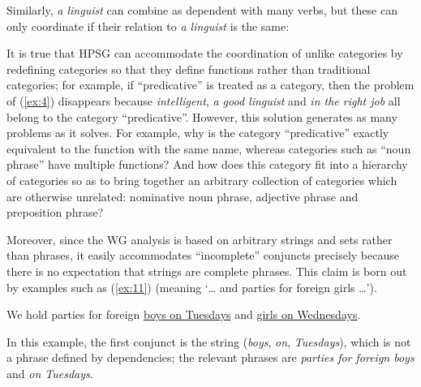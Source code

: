 \documentclass[output=paper]{langscibook}
\begin{document}
\begin{exe}
	\label{ex:5}

	\label{ex:6}

	\label{ex:7}
\end{exe}

Similarly, \emph{a linguist} can combine as dependent with many verbs, but these can only coordinate if their relation to \emph{a linguist} is the same:

\begin{exe}
	\label{ex:8}

	\label{ex:9}

	\label{ex:10}
\end{exe}

It is true that HPSG can accommodate the coordination of unlike categories by redefining categories so that they define functions rather than traditional categories; for example, if ``predicative'' is treated as a category, then the problem of (\ref{ex:4}) disappears because \emph{intelligent}, \emph{a good linguist} and \emph{in the right job} all belong to the category ``predicative''. However, this solution generates as many problems as it solves. For example, why is the category ``predicative'' exactly equivalent to the function with the same name, whereas categories such as ``noun phrase'' have multiple functions? And how does this category fit into a hierarchy of categories so as to bring together an arbitrary collection of categories which are otherwise unrelated: nominative noun phrase, adjective phrase and preposition phrase?

Moreover, since the WG analysis is based on arbitrary strings and sets rather than phrases, it easily accommodates ``incomplete'' conjuncts \citep[405]{Hudson90a-u} \citep{Hudson1982} precisely because there is no expectation that strings are complete phrases. This claim is born out by examples such as (\ref{ex:11}) (meaning ‘… and parties for foreign girls …’).

\begin{exe}
	\ex \label{ex:11} We hold parties for foreign \underline{boys on Tuesdays} and \underline{girls on Wednesdays}.
\end{exe}

In this example, the first conjunct is the string (\emph{boys}, \emph{on}, \emph{Tuesdays}), which is not a phrase defined by dependencies; the relevant phrases are \emph{parties for foreign boys} and \emph{on Tuesdays}.
\end{document}
